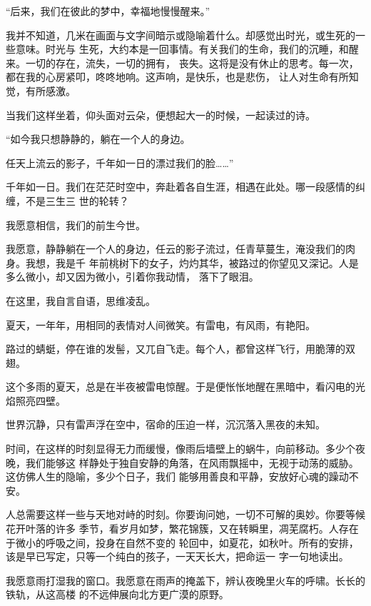 		“后来，我们在彼此的梦中，幸福地慢慢醒来。”

		我并不知道，几米在画面与文字间暗示或隐喻着什么。却感觉出时光，或生死的一些意味。时光与
	生死，大约本是一回事情。有关我们的生命，我们的沉睡，和醒来。一切的存在，流失，一切的拥有，
	丧失。这将是没有休止的思考。每一次，都在我的心房紧叩，咚咚地响。这声响，是快乐，也是悲伤，
	让人对生命有所知觉，有所感激。

		当我们这样坐着，仰头面对云朵，便想起大一的时候，一起读过的诗。

		“如今我只想静静的，躺在一个人的身边。

		任天上流云的影子，千年如一日的漂过我们的脸……”

		千年如一日。我们在茫茫时空中，奔赴着各自生涯，相遇在此处。哪一段感情的纠缠，不是三生三
	世的轮转？

		我愿意相信，我们的前生今世。

		我愿意，静静躺在一个人的身边，任云的影子流过，任青草蔓生，淹没我们的肉身。我想，我是千
	年前桃树下的女子，灼灼其华，被路过的你望见又深记。人是多么微小，却又因为微小，引着你我动情，
	落下了眼泪。


		在这里，我自言自语，思维凌乱。\par
		夏天，一年年，用相同的表情对人间微笑。有雷电，有风雨，有艳阳。\par
		路过的蜻蜓，停在谁的发髻，又兀自飞走。每个人，都曾这样飞行，用脆薄的双翅。

	\endwriting



		这个多雨的夏天，总是在半夜被雷电惊醒。于是便怅怅地醒在黑暗中，看闪电的光焰照亮四壁。

		世界沉静，只有雷声浮在空中，宿命的压迫一样，沉沉落入黑夜的未知。

		时间，在这样的时刻显得无力而缓慢，像雨后墙壁上的蜗牛，向前移动。多少个夜晚，我们能够这
	样静处于独自安静的角落，在风雨飘摇中，无视于动荡的威胁。这仿佛人生的隐喻，多少个日子，我们
	能够用善良和平静，安放好心魂的躁动不安。

		人总需要这样一些与天地对峙的时刻。你要询问她，一切不可解的奥妙。你要等候花开叶落的许多
	季节，看岁月如梦，繁花锦簇，又在转瞬里，凋芜腐朽。人存在于微小的呼吸之间，投身在自然不变的
	轮回中，如夏花，如秋叶。所有的安排，该是早已写定，只等一个纯白的孩子，一天天长大，把命运一
	字一句地读出。

		我愿意雨打湿我的窗口。我愿意在雨声的掩盖下，辨认夜晚里火车的呼啸。长长的铁轨，从这高楼
	的不远伸展向北方更广漠的原野。


